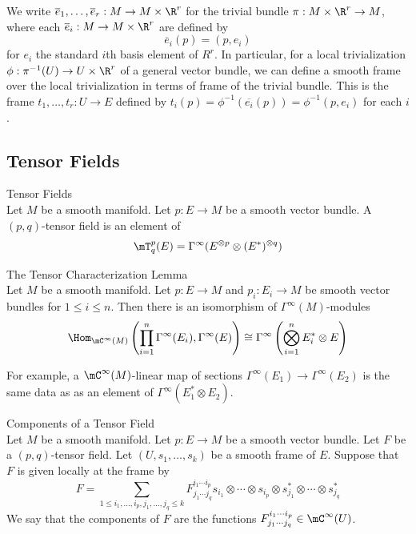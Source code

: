 \documentclass[a4paper]{article}
\begin{document}
We write $\overline{e}_1,\dots,\overline{e}_r:M\to M\times\R^r$ for the trivial bundle $\pi:M\times\R^r\to M$, where each $\overline{e}_i:M\to M\times\R^r$ are defined by $$\overline{e}_i(p)=(p,e_i)$$ for $e_i$ the standard $i$th basis element of $R^r$. In particular, for a local trivialization $\phi:\pi^{-1}(U)\to U\times\R^r$ of a general vector bundle, we can define a smooth frame over the local trivialization in terms of frame of the trivial bundle. This is the frame $t_1,\dots,t_r:U\to E$ defined by $t_i(p)=\phi^{-1}(\overline{e_i}(p))=\phi^{-1}(p,e_i)$ for each $i$. 

\subsection{Tensor Fields}
\begin{defn}{Tensor Fields}{}\\
Let $M$ be a smooth manifold. Let $p:E\to M$ be a smooth vector bundle. A $(p,q)$-tensor field is an element of $$\mT_q^p(E)=\Gamma^\infty(E^{\otimes p}\otimes(E^\ast)^{\otimes q})$$
\end{defn}

\begin{lmm}{The Tensor Characterization Lemma}{}\\
Let $M$ be a smooth manifold. Let $p:E\to M$ and $p_i:E_i\to M$ be smooth vector bundles for $1\leq i\leq n$. Then there is an isomorphism of $\Gamma^\infty(M)$-modules $$\Hom_{\mC^\infty(M)}\left(\prod_{i=1}^n\Gamma^\infty(E_i),\Gamma^\infty(E)\right)\cong\Gamma^\infty\left(\bigotimes_{i=1}^nE_i^\ast\otimes E\right)$$
\end{lmm}

For example, a $\mC^\infty(M)$-linear map of sections $\Gamma^\infty(E_1)\to\Gamma^\infty(E_2)$ is the same data as as an element of $\Gamma^\infty(E_1^\ast\otimes E_2)$. 

\begin{defn}{Components of a Tensor Field}{}\\
Let $M$ be a smooth manifold. Let $p:E\to M$ be a smooth vector bundle. Let $F$ be a $(p,q)$-tensor field. Let $(U,s_1,\dots,s_k)$ be a smooth frame of $E$. Suppose that $F$ is given locally at the frame by $$F=\sum_{1\leq i_1,\dots,i_p,j_1,\dots,j_q\leq k}F^{i_1\cdots i_p}_{j_1\cdots j_q} s_{i_1}\otimes\cdots\otimes s_{i_p}\otimes s_{j_1}^\ast\otimes\cdots\otimes s_{j_q}^\ast$$ We say that the components of $F$ are the functions $F^{i_1\cdots i_p}_{j_1\cdots j_q}\in\mC^\infty(U)$. 
\end{defn}
\end{document}
